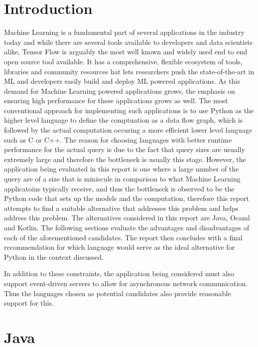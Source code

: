 \section{Introduction}
Machine Learning is a fundamental part of several applications in the industry today and while there are several tools available to developers and data scientists alike, Tensor Flow is arguably the most well known and widely used end to end open source tool available. It has a comprehensive, flexible ecosystem of tools, libraries and community resources hat lets researchers push the state-of-the-art in ML and developers easily build and deploy ML powered applications. As this demand for Machine Learning powered applications grows, the emphasis on ensuring high performance for these applications grows as well. The most conventional approach for implementing such applications is to use Python as the higher level language to define the comptuation as a data flow graph, which is followed by the actual computation occuring a more efficient lower level language such as C or C++. The reason for choosing languages with better runtime performance for the actual query is due to the fact that query sizes are usually extremely large and therefore the bottleneck is usually this stage. However, the application being evaluated in this report is one where a large number of the query are of a size that is miniscule in comparison to what Machine Learning applicatoins typically receive, and thus the bottleneck is observed to be the Python code that sets up the models and the computation, therefore this report attempts to find a suitable alternative that addresses this problem and helps address this problem. The alternatives considered in this report are Java, Ocaml and Kotlin. The following sections evaluate the advantages and disadvantages of each of the aforementioned candidates. The report then concludes with a final recommendation for which language would serve as the ideal alternative for Python in the context discussed. \newline

\noindent In addition to these constraints, the application being considered must also support event-driven servers to allow for asynchronous network communication. Thus the languages chosen as potential candidates also provide reasonable support for this. 

\section{Java}

